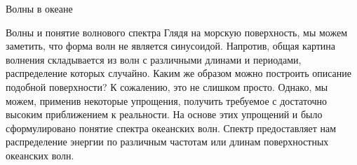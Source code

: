 \begin{chapter}{Волны в океане}
\begin{section}{Волны и понятие волнового спектра}
%
Глядя на морскую поверхность, мы можем 
заметить, что форма волн не является синусоидой. Напротив, общая картина
волнения складывается из волн с различными длинами и периодами, распределение
которых случайно. Каким же образом можно построить описание подобной 
поверхности? К сожалению, это не слишком просто. Однако, мы можем, применив
некоторые упрощения, получить требуемое с достаточно высоким приближением
к реальности. На основе этих упрощений и было сформулировано понятие спектра
океанских волн. Спектр предоставляет нам распределение энергии по
различным частотам или длинам поверхностных океанских волн.
%


\end{section}
\end{chapter}

